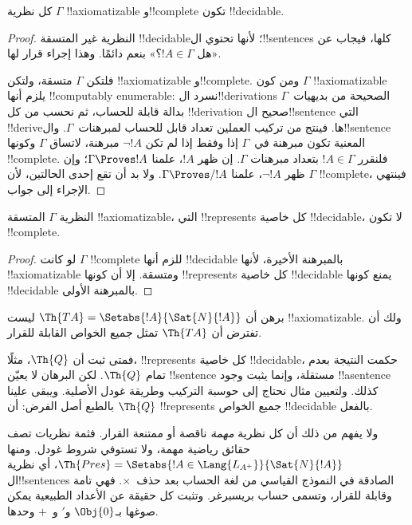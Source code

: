 \documentclass[../../../include/open-logic-section]{subfiles}
\begin{document}
\begin{thm}
كل نظرية $\Gamma$ !!{axiomatizable}
و!!{complete} تكون !!{decidable}.
\end{thm}

\begin{proof}
النظرية غير المتسقة !!{decidable}؛ لأنها
تحتوي ال!!{sentence}s كلها، فيجاب عن
«هل $!A\in\Gamma$؟» بنعم دائمًا. وهذا
إجراء قرار لها.

فلتكن $\Gamma$ متسقة، ولتكن !!{axiomatizable}
و!!{complete}. ومن كون $\Gamma$
!!{axiomatizable} يلزم أنها !!{computably enumerable}:
نسرد ال!!{derivation}s الصحيحة من بديهيات~$\Gamma$
بدالة قابلة للحساب، ثم نحسب من كل
!!{derivation} صحيح ال!!{sentence} التي
!!{derive}ها. فينتج من تركيب العملين
تعداد قابل للحساب لمبرهنات~$\Gamma$.
وال!!{sentence} المعنية تكون مبرهنة
في~$\Gamma$ إذا وفقط إذا لم تكن $\lnot !A$
مبرهنة، لاتساق $\Gamma$ وكونها !!{complete}.
فلنقرر $!A\in\Gamma$ بتعداد مبرهنات $\Gamma$.
إن ظهر $!A$، علمنا $\Gamma\Proves !A$؛
وإن ظهر $\lnot !A$، علمنا
$\Gamma\Proves/ !A$. ولا بد أن تقع
إحدى الحالتين، لأن $\Gamma$ !!{complete}،
فينتهي الإجراء إلى جواب.
\end{proof}

\begin{cor}
النظرية $\Gamma$ المتسقة !!{axiomatizable}، التي
!!{represents} كل خاصية !!{decidable}، لا تكون !!{complete}.
\end{cor}

\begin{proof}
لو كانت $\Gamma$ !!{complete} للزم أنها
!!{decidable} بالمبرهنة الأخيرة، لأنها
!!{axiomatizable} ومتسقة. إلا أن كونها
!!{represents} كل خاصية !!{decidable}
يمنع كونها !!{decidable} بالمبرهنة الأولى.
\end{proof}

\begin{prob}
برهن أن $\Th{TA}=\Setabs{!A}{\Sat{N}{!A}}$ ليست
!!{axiomatizable}. ولك أن تفترض أن $\Th{TA}$ تمثل جميع الخواص
القابلة للقرار.
\end{prob}

فمتى ثبت أن $\Th{Q}$، مثلًا، !!{represents}
كل خاصية !!{decidable}، حكمت النتيجة
بعدم تمام $\Th{Q}$. لكن البرهان لا
يعيّن !!{sentence} مستقلة، وإنما يثبت
وجود !!a{sentence} كذلك. ولتعيين مثال
نحتاج إلى حوسبة التركيب وطريقة غودل الأصلية.
ويبقى علينا بالطبع أصل الفرض: أن
$\Th{Q}$ !!{represents} جميع الخواص
!!{decidable} بالفعل.

ولا يفهم من ذلك أن كل نظرية \emph{مهمة}
ناقصة أو ممتنعة القرار. فثمة نظريات
تصف حقائق رياضية مهمة، ولا تستوفي
شروط غودل. ومنها
$\Th{Pres}=\Setabs{!A\in\Lang{L_{A^+}}}{\Sat{N}{!A}}$،
أي نظرية ال!!{sentence}s الصادقة في
النموذج القياسي من لغة الحساب بعد حذف~$\times$.
فهي تامة وقابلة للقرار، وتسمى حساب بريسبرغر.
وتثبت كل حقيقة عن الأعداد الطبيعية يمكن
صوغها بـ$\Obj{0}$ و$\prime$ و~$+$ وحدها.
\end{document}
